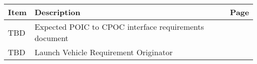 
        \clearpage
        \sffamily
        \bfseries
        \normalfont
        \centering
        \begin{table}[htbp]
        \begin{minipage}{\linewidth}
        \setlength{\tymax}{0.5\linewidth}
        \centering
        \small\begin{tabular}{| >{\centering\arraybackslash}m{1.25in}| >{\centering\arraybackslash}m{2.95in}| >{\centering\arraybackslash}m{1.5in}|} \hline
        \bfseries{Item} & \bfseries{Description} & \bfseries{Page}\\
        \hline
        TBD & Expected POIC to CPOC interface requirements document & \pageref{tbx_1}  \\ 
 \hline 
TBD & Launch Vehicle Requirement Originator & \pageref{tbx_2}  \\ 
 \hline 
\end{tabular}
    \end{minipage}
    \end{table}
    \raggedright
    \clearpage